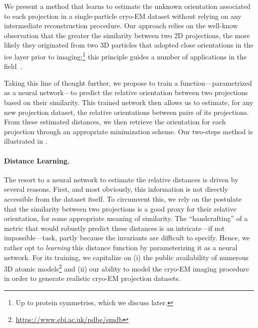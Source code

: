 We present a method that learns to estimate the unknown orientation associated to each projection in a single-particle cryo-EM dataset without relying on any intermediate reconstruction procedure. Our approach relies on the well-know observation that the greater the similarity between two 2D projections, the more likely they originated from two 3D particles that adopted close orientations in the ice layer prior to imaging;\footnote{Up to protein symmetries, which we discuss later.} this principle guides a number of applications in the field~\cite{frank2006three}.

Taking this line of thought further, we propose to train a function---parametrized as a neural network---to predict the relative orientation between two projections based on their similarity. This trained network then allows us to estimate, for any new projection dataset, the relative orientations between pairs of its projections. From these estimated distances, we then retrieve the orientation for each projection through an appropriate minimization scheme. Our two-steps method is illustrated in .


\paragraph{Distance Learning.}
The resort to a neural network to estimate the relative distances is driven by several reasons. First, and most obviously, this information is not directly accessible from the dataset itself. To circumvent this, we rely on the postulate that the similarity between two projections is a good proxy for their relative orientation, for some appropriate meaning of similarity. The ``handcrafting'' of a metric that would robustly predict these distances is an intricate---if not impossible---task, partly because the invariants are difficult to specify. Hence, we rather opt to \textit{learning} this distance function by parameterizing it as a neural network. For its training, we capitalize on (i) the public availability of numerous 3D atomic models\footnote{\url{https://www.ebi.ac.uk/pdbe/emdb}} and (ii) our ability to model the cryo-EM imaging procedure in order to generate realistic cryo-EM projection datasets.


